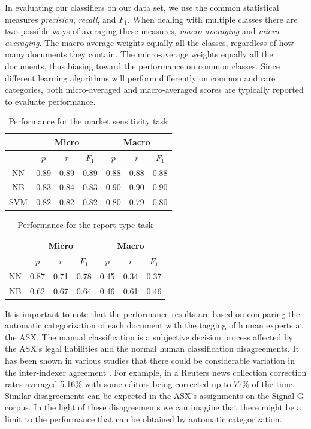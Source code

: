 \documentclass[twocolumn]{article}
\begin{document}
In evaluating our classifiers on our data set, we use the common
statistical measures \emph{precision}, \emph{recall}, and
$F_1$. \cite{yang:99} \cite{rijsbergen:79} When dealing with multiple
classes there are two possible ways of averaging these measures,
\emph{macro-averaging} and \emph{micro-averaging}. The macro-average
weights equally all the classes, regardless of how many documents they
contain. The micro-average weights equally all the documents, thus
biasing toward the performance on common classes.  Since different
learning algorithms will perform differently on common and rare
categories, both micro-averaged and macro-averaged scores are
typically reported to evaluate performance.

\begin{table}
\begin{tabular}{|c|c|c|c|c|c|c|}
\hline
   & \multicolumn{3}{|c|}{Micro} & \multicolumn{3}{|c|}{Macro} \\
\hline
   & $p$  & $r$  &$F_1$ & $p$  & $r$  & $F_1$ \\
\hline
 NN & 0.89 & 0.89 & 0.89 & 0.88 & 0.88 & 0.88 \\
 NB & 0.83 & 0.84 & 0.83 & 0.90 & 0.90 & 0.90 \\
SVM & 0.82 & 0.82 & 0.82 & 0.80 & 0.79 & 0.80 \\
\hline
\end{tabular}
\caption{Performance for the market sensitivity task}
\label{res:sens}
\end{table}


\begin{table}
\begin{tabular}{|c|c|c|c|c|c|c|}
\hline
   & \multicolumn{3}{|c|}{Micro} & \multicolumn{3}{|c|}{Macro} \\
\hline
   & $p$  & $r$  &$F_1$ & $p$  & $r$  & $F_1$ \\
\hline
NN & 0.87 & 0.71 & 0.78 & 0.45 & 0.34 & 0.37  \\
NB & 0.62 & 0.67 & 0.64 & 0.46 & 0.61 & 0.46  \\
\hline
\end{tabular}
\caption{Performance for the report type task}
\label{res:rept}
\end{table}

It is important to note that the performance results are based on
comparing the automatic categorization of each document with the
tagging of human experts at the ASX. The manual classification is a
subjective decision process affected by the ASX's legal liabilities
and the normal human classification disagreements. It has been shown
in various studies that there could be considerable variation in the
inter-indexer agreement \cite{bruce:98} \cite{brants:00}. For example,
in a Reuters news collection correction rates averaged 5.16\%
\cite{rose:02} with some editors being corrected up to 77\% of the
time. Similar disagreements can be expected in the ASX's assignments
on the Signal G corpus.  In the light of these disagreements we can
imagine that there might be a limit to the performance that can be
obtained by automatic categorization.
\end{document}
